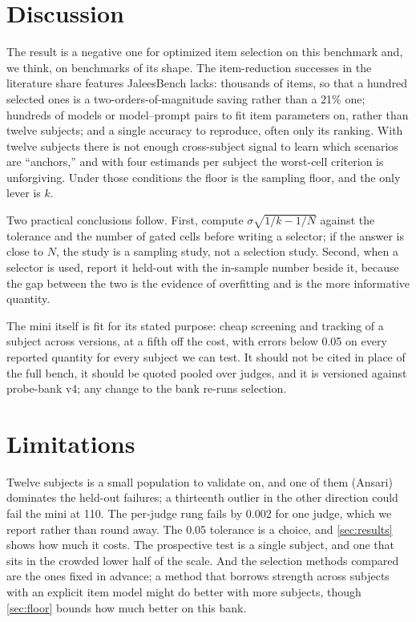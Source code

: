 \documentclass[11pt]{article}
\begin{document}
\section{Discussion}\label{sec:discussion}

The result is a negative one for optimized item selection on this benchmark
and, we think, on benchmarks of its shape. The item-reduction successes in
the literature share features JaleesBench lacks: thousands of items, so that
a hundred selected ones is a two-orders-of-magnitude saving rather than a
21\% one; hundreds of models or model--prompt pairs to fit item parameters
on, rather than twelve subjects; and a single accuracy to reproduce, often
only its ranking. With twelve subjects there is not enough cross-subject
signal to learn which scenarios are ``anchors,'' and with four estimands per
subject the worst-cell criterion is unforgiving. Under those conditions the
floor is the sampling floor, and the only lever is $k$.

Two practical conclusions follow. First, compute $\sigma\sqrt{1/k-1/N}$
against the tolerance and the number of gated cells before writing a
selector; if the answer is close to $N$, the study is a sampling study, not a
selection study. Second, when a selector is used, report it held-out with
the in-sample number beside it, because the gap between the two is the
evidence of overfitting and is the more informative quantity.

The mini itself is fit for its stated purpose: cheap screening and tracking
of a subject across versions, at a fifth off the cost, with errors below
0.05 on every reported quantity for every subject we can test. It should not
be cited in place of the full bench, it should be quoted pooled over judges,
and it is versioned against probe-bank v4; any change to the bank re-runs
selection.

\section{Limitations}\label{sec:limitations}

Twelve subjects is a small population to validate on, and one of them
(Ansari) dominates the held-out failures; a thirteenth outlier in the other
direction could fail the mini at 110. The per-judge rung fails by 0.002 for
one judge, which we report rather than round away. The 0.05 tolerance is a
choice, and \cref{sec:results} shows how much it costs. The prospective test
is a single subject, and one that sits in the crowded lower half of the
scale. And the selection methods compared are the ones fixed in
advance; a method that borrows strength across subjects with an explicit
item model might do better with more subjects, though \cref{sec:floor}
bounds how much better on this bank.
\end{document}
